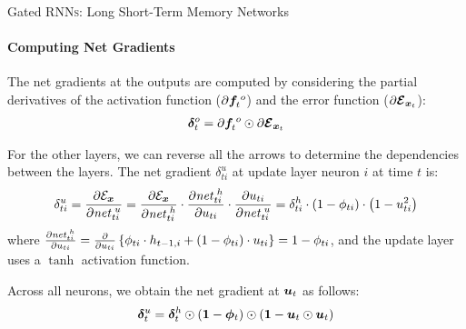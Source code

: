 %
\begin{frame}{Gated RNN\textsc{s}: Long Short-Term Memory Networks}
\framesubtitle{Computing Net Gradients}
The
net gradients at the outputs are computed by considering the
partial derivatives of the activation function ($\partial{\boldsymbol f}^{\;o}_t$)
and the error function ($\partial{\bm{\mathcal E}}_{{\boldsymbol x}_t}$):
\begin{align*}
    {\bm \delta}^o_t = \partial{\boldsymbol f}^{\;o}_t \odot \partial{\bm{\mathcal E}}_{{\boldsymbol x}_t}
\end{align*}

For the other layers, we can reverse all the arrows to determine the
dependencies between the layers.
The net gradient $\delta_{ti}^u$ at update layer neuron $i$ at time $t$ is:
\begin{align*}
    \delta_{ti}^u = 
    \frac{\partial {\mathcal E}_{\boldsymbol x}}{\partial \mathit{net}^{\;u}_{ti}}  = 
    \frac{\partial {\mathcal E}_{\boldsymbol x}}{\partial \mathit{net}^{\;h}_{ti}} \cdot 
    \frac{\partial \mathit{net}^{\;h}_{ti}}{\partial u_{ti}} \cdot
    \frac{\partial u_{ti}}{\partial \mathit{net}^{\;u}_{ti}}
     = \delta^h_{ti} \cdot (1 - \phi_{ti}) \cdot \left(1-u_{ti}^2\right)
\end{align*}
where 
$\frac{\partial \mathit{net}^{\;h}_{ti}}{\partial u_{ti}} = 
     \frac{\partial}{\partial
    u_{ti}} \left\{ \phi_{ti} \cdot h_{t-1,i} +  (1-\phi_{ti}) \cdot
    u_{ti}\right\} = 1 - \phi_{ti}$, and 
the update layer uses a $\tanh$ activation function.

\medskip

Across all neurons, we obtain the net gradient at
${\boldsymbol u}_t$ as follows:
\begin{align*}
    {\bm \delta}^{u}_{t} = {\bm \delta}^h_t \odot (\mathbf{1} -{\bm \phi}_t) 
    \odot (\mathbf{1} - {\boldsymbol u}_t  \odot {\boldsymbol u}_t )
\end{align*}
\end{frame}

